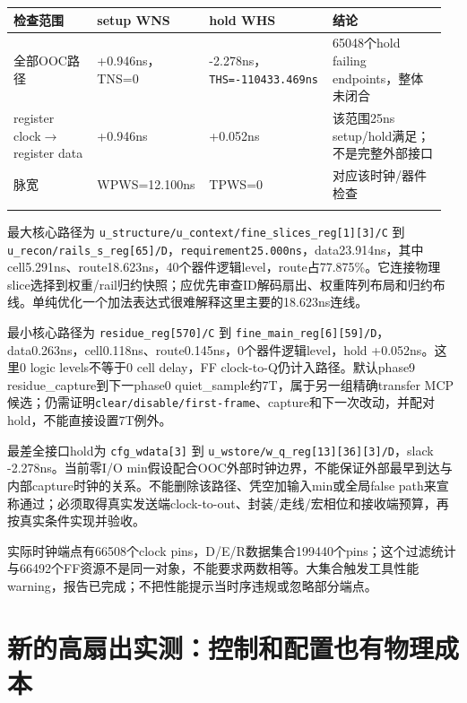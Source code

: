 \documentclass[UTF8,fontset=fandol,10pt,a4paper,openany]{ctexrep}
\newcommand{\code}[1]{\nolinkurl{#1}}
\begin{document}
\begingroup\small\setlength{\tabcolsep}{2pt}\renewcommand{\arraystretch}{1.25}\begin{longtable}{@{}>{\raggedright\arraybackslash}p{0.19\linewidth}>{\raggedright\arraybackslash}p{0.24\linewidth}>{\raggedright\arraybackslash}p{0.27\linewidth}>{\raggedright\arraybackslash}p{0.26\linewidth}@{}}
\toprule
\textbf{检查范围} & \textbf{setup WNS} & \textbf{hold WHS} & \textbf{结论}\\\midrule\endhead
全部OOC路径 & +0.946ns，TNS=0 & -2.278ns，\code{THS=-110433.469ns} & 65048个hold failing endpoints，整体未闭合\\\addlinespace[2pt]
register clock\ensuremath{\rightarrow}register data & +0.946ns & +0.052ns & 该范围25ns setup/hold满足；不是完整外部接口\\\addlinespace[2pt]
脉宽 & WPWS=12.100ns & TPWS=0 & 对应该时钟/器件检查\\\addlinespace[2pt]
\bottomrule\end{longtable}\endgroup


最大核心路径为 \code{u_structure/u_context/fine_slices_reg[1][3]/C} 到 \code{u_recon/rails_s_reg[65]/D}，\code{requirement25.000ns}，data23.914ns，其中cell5.291ns、route18.623ns，40个器件逻辑level，route占77.875\%。它连接物理slice选择到权重/rail归约快照；应优先审查ID解码扇出、权重阵列布局和归约布线。单纯优化一个加法表达式很难解释这里主要的18.623ns连线。


最小核心路径为 \code{residue_reg[570]/C} 到 \code{fine_main_reg[6][59]/D}，data0.263ns，cell0.118ns、route0.145ns，0个器件逻辑level，hold +0.052ns。这里0 logic levels不等于0 cell delay，FF clock-to-Q仍计入路径。默认phase9 residue\_capture到下一phase0 quiet\_sample约7T，属于另一组精确transfer MCP候选；仍需证明\code{clear/disable/first-frame}、capture和下一次改动，并配对hold，不能直接设置7T例外。


最差全接口hold为 \code{cfg_wdata[3]} 到 \code{u_wstore/w_q_reg[13][36][3]/D}，slack -2.278ns。当前零I/O min假设配合OOC外部时钟边界，不能保证外部最早到达与内部capture时钟的关系。不能删除该路径、凭空加输入min或全局false path来宣称通过；必须取得真实发送端clock-to-out、封装/走线/宏相位和接收端预算，再按真实条件实现并验收。


实际时钟端点有66508个clock pins，D/E/R数据集合199440个pins；这个过滤统计与66492个FF资源不是同一对象，不能要求两数相等。大集合触发工具性能warning，报告已完成；不把性能提示当时序违规或忽略部分端点。


\section{新的高扇出实测：控制和配置也有物理成本}
\end{document}
